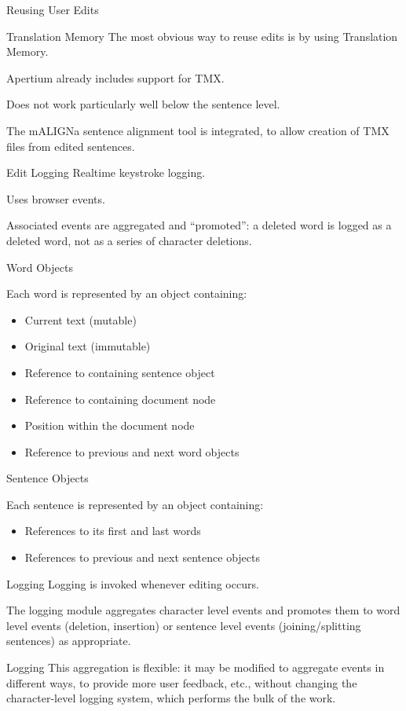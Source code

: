 \documentclass{beamer}
\begin{document}
\begin{section}{Reusing User Edits}
\begin{frame}{Translation Memory}
The most obvious way to reuse edits is by using Translation Memory.

Apertium already includes support for TMX.

Does not work particularly well below the sentence level.

The mALIGNa sentence alignment tool is integrated, to allow
creation of TMX files from edited sentences.
\end{frame}

\begin{frame}{Edit Logging}
Realtime keystroke logging.

Uses browser events.

Associated events are aggregated and ``promoted'': a deleted 
word is logged as a deleted word, not as a series of character 
deletions.
\end{frame}

\begin{frame}{Word Objects}

Each word is represented by an object containing:

\begin{itemize}
\item Current text (mutable)
\item Original text (immutable)
\item Reference to containing sentence object
\item Reference to containing document node
\item Position within the document node
\item Reference to previous and next word objects
\end{itemize}
\end{frame}

\begin{frame}{Sentence Objects}

Each sentence is represented by an object containing:

\begin{itemize}
\item References to its first and last words
\item References to previous and next sentence objects
\end{itemize}
\end{frame}

\begin{frame}{Logging}
Logging is invoked whenever editing occurs.

The logging module aggregates character level events and
promotes them to word level events (deletion, insertion)
or sentence level events (joining/splitting sentences)
as appropriate.
\end{frame}

\begin{frame}{Logging}
This aggregation is flexible: it may be modified to
aggregate events in different ways, to provide more
user feedback, etc., without changing the character-level
logging system, which performs the bulk of the work.
\end{frame}
\end{section}
\end{document}

